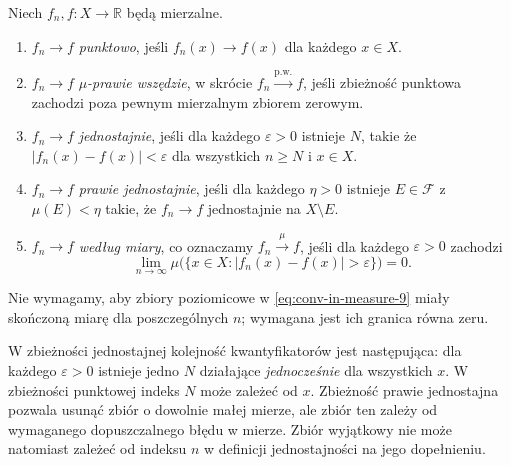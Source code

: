 \begin{definicja}
\label{def:five-convergences}
Niech $f_n,f:X\to\mathbb R$ będą mierzalne.
\begin{enumerate}[label=\textup{(\roman*)}]
\item $f_n\to f$ \emph{punktowo}, jeśli
$f_n(x)\to f(x)$ dla każdego $x\in X$.
\item $f_n\to f$ \emph{$\mu$-prawie wszędzie}, w skrócie
$f_n\xrightarrow{\mathrm{p.w.}}f$, jeśli zbieżność
punktowa zachodzi poza pewnym mierzalnym zbiorem zerowym.
\item $f_n\to f$ \emph{jednostajnie}, jeśli dla każdego
$\varepsilon>0$ istnieje $N$, takie że
$|f_n(x)-f(x)|<\varepsilon$ dla wszystkich $n\ge N$
i $x\in X$.
\item $f_n\to f$ \emph{prawie jednostajnie}, jeśli dla każdego
$\eta>0$ istnieje $E\in\mathcal F$ z $\mu(E)<\eta$
takie, że $f_n\to f$ jednostajnie na $X\setminus E$.
\item $f_n\to f$ \emph{według miary}, co oznaczamy
$f_n\xrightarrow{\mu}f$, jeśli dla każdego $\varepsilon>0$
zachodzi
\begin{equation}\label{eq:conv-in-measure-9}
\lim_{n\to\infty}\mu\bigl(\{x\in X:
|f_n(x)-f(x)|>\varepsilon\}\bigr)=0.
\end{equation}
\end{enumerate}
Nie wymagamy, aby zbiory poziomicowe w
\eqref{eq:conv-in-measure-9} miały skończoną miarę dla
poszczególnych $n$; wymagana jest ich granica równa zeru.
\end{definicja}

\begin{uwaga}
W zbieżności jednostajnej kolejność kwantyfikatorów jest
następująca: dla każdego $\varepsilon>0$ istnieje jedno $N$
działające \emph{jednocześnie} dla wszystkich $x$. W zbieżności
punktowej indeks $N$ może zależeć od $x$. Zbieżność prawie
jednostajna pozwala usunąć zbiór o dowolnie małej mierze,
ale zbiór ten zależy od wymaganego dopuszczalnego błędu w mierze.
Zbiór wyjątkowy nie może natomiast zależeć od indeksu $n$
w definicji jednostajności na jego dopełnieniu.
\end{uwaga}

